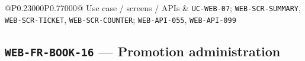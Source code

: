 \begin{longtable}{@{}P{0.23000\SRSWidth}P{0.77000\SRSWidth}@{}}
Use case /\allowbreak{} screens /\allowbreak{} APIs & \texttt{UC-\allowbreak{}WEB-\allowbreak{}07}; \texttt{WEB-\allowbreak{}SCR-\allowbreak{}SUMMARY}, \texttt{WEB-\allowbreak{}SCR-\allowbreak{}TICKET}, \texttt{WEB-\allowbreak{}SCR-\allowbreak{}COUNTER}; \texttt{WEB-\allowbreak{}API-\allowbreak{}055}, \texttt{WEB-\allowbreak{}API-\allowbreak{}099} \\[3pt]
\end{longtable}
\endgroup

\subsection{\texttt{WEB-\allowbreak{}FR-\allowbreak{}BOOK-\allowbreak{}16} — Promotion administration}
\begingroup
\fontsize{9.5}{12}\selectfont
\setlength{\SRSWidth}{\dimexpr\linewidth-2\tabcolsep\relax}
